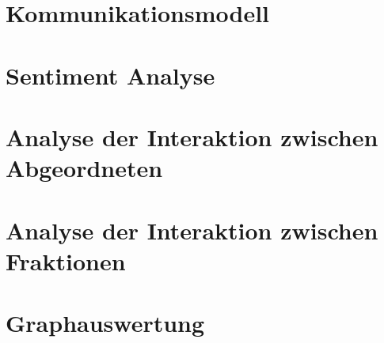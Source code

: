 \documentclass[a4paper,12pt,twoside]{book}
\begin{document}
\chapter{Kommunikationsmodell}






\chapter{Sentiment Analyse}






\chapter{Analyse der Interaktion zwischen Abgeordneten}






\chapter{Analyse der Interaktion zwischen Fraktionen}






\chapter{Graphauswertung}





\end{document}
